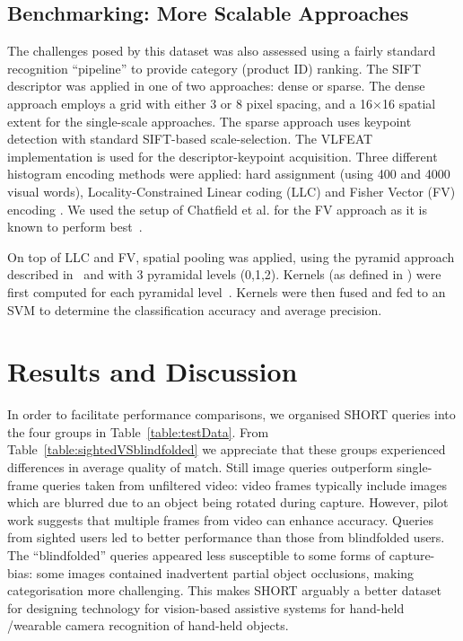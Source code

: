 \subsection{Benchmarking: More Scalable Approaches}
\label{sec:bof}

The challenges posed by this dataset was also assessed using a fairly standard recognition ``pipeline'' to provide category (product ID) ranking. The SIFT descriptor was applied in one of two approaches: dense or sparse. The dense approach employs a grid with either 3 or 8 pixel spacing, and a 16$\times$16 spatial extent for the single-scale approaches. The sparse approach uses keypoint detection with standard SIFT-based scale-selection. The VLFEAT implementation is used for the descriptor-keypoint acquisition. Three different histogram encoding methods were applied: hard assignment \cite{Csurka2004} (using 400 and 4000 visual words), Locality-Constrained Linear coding (LLC) \cite{Wang2010} and Fisher Vector (FV) encoding \cite{Perronnin2010}. We used the setup of Chatfield et al. for the FV approach as it is known to perform best~\cite{Chatfield2011}.

On top of LLC and FV, spatial pooling was applied, using the pyramid approach described in~\cite{Lazebnik2006} and with 3 pyramidal levels (0,1,2). Kernels (as defined in \cite{Vedaldi2010}) were first computed for each pyramidal level~\cite{VanDeSande2010}. Kernels were then fused and fed to an SVM to determine the classification accuracy and average precision. 


\section{Results and Discussion} \label{sec:analysis} \label{sec:results}



In order to facilitate performance comparisons, we organised SHORT queries into the four groups in Table~\ref{table:testData}. From Table~\ref{table:sightedVSblindfolded} we appreciate that these groups experienced differences in average quality of match. Still image queries outperform single-frame queries taken from unfiltered video: video frames typically include images which are blurred due to an object being rotated during capture. However, pilot work suggests that multiple frames from video can enhance accuracy. Queries from sighted users led to better performance than those from blindfolded users. The ``blindfolded'' queries appeared less susceptible to some forms of  capture-bias: some images contained inadvertent partial object occlusions, making categorisation more challenging. This makes SHORT arguably a better dataset for designing technology for vision-based assistive systems for hand-held /wearable camera recognition of hand-held objects.


